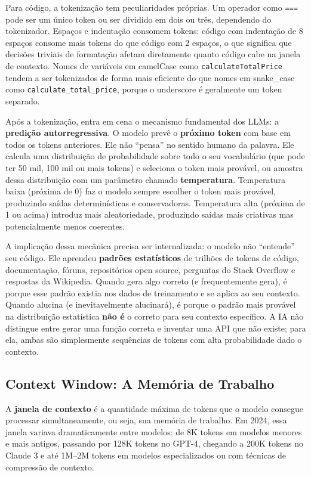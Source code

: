Para código, a tokenização tem peculiaridades próprias. Um operador como \texttt{===}
pode ser um único token ou ser dividido em dois ou três, dependendo do tokenizador.
Espaços e indentação consomem tokens: código com indentação de 8 espaços consome
mais tokens do que código com 2 espaços, o que significa que decisões triviais de
formatação afetam diretamente quanto código cabe na janela de contexto. Nomes de
variáveis em camelCase como \texttt{calculateTotalPrice} tendem a ser tokenizados de
forma mais eficiente do que nomes em snake\_case como \texttt{calculate\_total\_price},
porque o underscore é geralmente um token separado.

Após a tokenização, entra em cena o mecanismo fundamental dos LLMs: a \textbf{predição
autorregressiva}. O modelo prevê o \textbf{próximo token} com base em todos os tokens
anteriores. Ele não ``pensa'' no sentido humano da palavra. Ele calcula uma
distribuição de probabilidade sobre todo o seu vocabulário (que pode ter 50 mil, 100
mil ou mais tokens) e seleciona o token mais provável, ou amostra dessa distribuição
com um parâmetro chamado \textbf{temperatura}. Temperatura baixa (próxima de 0) faz
o modelo sempre escolher o token mais provável, produzindo saídas determinísticas e
conservadoras. Temperatura alta (próxima de 1 ou acima) introduz mais aleatoriedade,
produzindo saídas mais criativas mas potencialmente menos coerentes.

A implicação dessa mecânica precisa ser internalizada: o
modelo não ``entende'' seu código. Ele aprendeu \textbf{padrões estatísticos} de
trilhões de tokens de código, documentação, fóruns, repositórios open source,
perguntas do Stack Overflow e respostas da Wikipedia. Quando gera algo correto (e
frequentemente gera), é porque esse padrão existia nos dados de treinamento e se
aplica ao seu contexto. Quando alucina (e inevitavelmente alucinará), é porque
o padrão mais provável na distribuição estatística \textbf{não é} o correto para seu
contexto específico. A IA não distingue entre gerar uma função correta e inventar uma
API que não existe; para ela, ambas são simplesmente sequências de tokens com alta
probabilidade dado o contexto.

\subsection{Context Window: A Memória de Trabalho}

A \textbf{janela de contexto} é a quantidade máxima de tokens que o modelo consegue
processar simultaneamente, ou seja, sua memória de trabalho. Em 2024,
essa janela variava dramaticamente entre modelos: de 8K tokens em modelos menores e
mais antigos, passando por 128K tokens no GPT-4, chegando a 200K tokens no Claude 3
e até 1M--2M tokens em modelos especializados ou com técnicas de compressão de
contexto.

